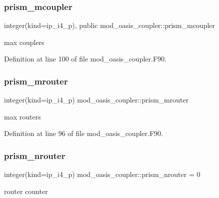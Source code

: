 \subsubsection{\texorpdfstring{prism\+\_\+mcoupler}{prism\_mcoupler}}
{\footnotesize\ttfamily integer(kind=ip\+\_\+i4\+\_\+p), public mod\+\_\+oasis\+\_\+coupler\+::prism\+\_\+mcoupler}



max couplers 



Definition at line 100 of file mod\+\_\+oasis\+\_\+coupler.\+F90.

\mbox{\label{namespacemod__oasis__coupler_a6d46883e9df70ab9cdafaf607afacacb}} 
\subsubsection{\texorpdfstring{prism\+\_\+mrouter}{prism\_mrouter}}
{\footnotesize\ttfamily integer(kind=ip\+\_\+i4\+\_\+p) mod\+\_\+oasis\+\_\+coupler\+::prism\+\_\+mrouter\hspace{0.3cm}{\ttfamily [private]}}



max routers 



Definition at line 96 of file mod\+\_\+oasis\+\_\+coupler.\+F90.

\mbox{\label{namespacemod__oasis__coupler_a2ebdb255598e1b004de2533f16b06e04}} 
\subsubsection{\texorpdfstring{prism\+\_\+nrouter}{prism\_nrouter}}
{\footnotesize\ttfamily integer(kind=ip\+\_\+i4\+\_\+p) mod\+\_\+oasis\+\_\+coupler\+::prism\+\_\+nrouter = 0\hspace{0.3cm}{\ttfamily [private]}}



router counter 



